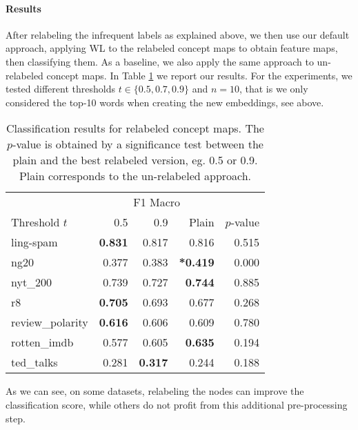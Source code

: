 \paragraph{Results}
After relabeling the infrequent labels as explained above, we then use our default approach, applying WL to the relabeled concept maps to obtain feature maps, then classifying them.
As a baseline, we also apply the same approach to un-relabeled concept maps.
In Table \ref{table:results_infrequent_relabeled} we report our results.
For the experiments, we tested different thresholds $t \in \{0.5, 0.7, 0.9\}$ and $n=10$, that is we only considered the top-10 words when creating the new embeddings, see above.

\begin{table}[htb!]
    \centering
    \begin{tabular}{lrrrr}
\toprule
        {} & \multicolumn{3}{c}{F1 Macro} &  \\
        Threshold $t$ &         0.5 &   0.9 & Plain & $p$-value \\
        \midrule
        ling-spam       & \textbf{0.831} & 0.817 & 0.816 & 0.515 \\
        ng20            & 0.377 & 0.383 & \textbf{*0.419} & 0.000 \\
        nyt\_200         & 0.739 & 0.727 & \textbf{0.744} & 0.885 \\
        r8              & \textbf{0.705} & 0.693 & 0.677 & 0.268 \\
        review\_polarity & \textbf{0.616} & 0.606 & 0.609 & 0.780 \\
        rotten\_imdb     & 0.577 & 0.605 & \textbf{0.635} & 0.194 \\
        ted\_talks       & 0.281 & \textbf{0.317} & 0.244 & 0.188 \\
        \bottomrule
    \end{tabular}
    \caption[Results: Merge infrequent nodes]{Classification results for relabeled concept maps. The $p$-value is obtained by a significance test between the plain and the best relabeled version, eg. 0.5 or 0.9. Plain corresponds to the un-relabeled approach. }
    \label{table:results_infrequent_relabeled}
\end{table}

As we can see, on some datasets, relabeling the nodes can improve the classification score, while others do not profit from this additional pre-processing step.

